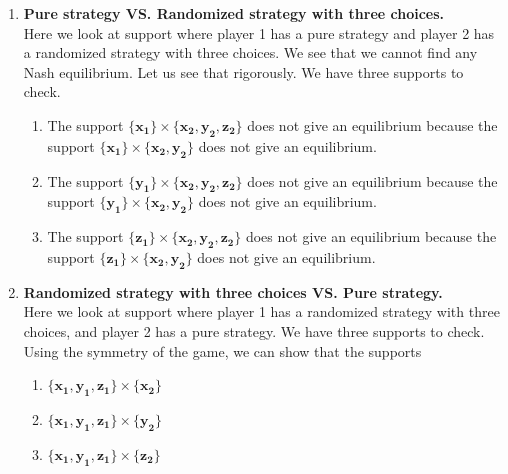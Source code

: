 \begin{enumerate} [label=\Alph*. ]
\begin{enumerate} [label*= (\arabic*)]
    \item $\mathbf{\{x_1, y_1\}} \times \mathbf{\{y_2\}}$
    \item $\mathbf{\{x_1, z_1\}} \times \mathbf{\{y_2\}}$
    \item $\mathbf{\{y_1, z_1\}} \times \mathbf{\{y_2\}}$
    
    \item $\mathbf{\{x_1, y_1\}} \times \mathbf{\{z_2\}}$
    \item $\mathbf{\{x_1, z_1\}} \times \mathbf{\{z_2\}}$
    \item $\mathbf{\{y_1, z_1\}} \times \mathbf{\{z_2\}}$
\end{enumerate}

do not give an equilibrium.


\item \textbf{Pure strategy VS. Randomized strategy with three choices.} \\
Here we look at support where player 1 has a pure strategy and player 2 has a randomized strategy with three choices. We see that we cannot find any Nash equilibrium. Let us see that rigorously. We have three supports to check.

\begin{enumerate} [label*= (\arabic*)]
    \item The support $\mathbf{\{x_1\}} \times \mathbf{\{x_2, y_2, z_2\}}$ does not give an equilibrium because the support $\mathbf{\{x_1\}} \times \mathbf{\{x_2, y_2\}}$ does not give an equilibrium.
    
    \item The support $\mathbf{\{y_1\}} \times \mathbf{\{x_2, y_2, z_2\}}$ does not give an equilibrium because the support $\mathbf{\{y_1\}} \times \mathbf{\{x_2, y_2\}}$ does not give an equilibrium.
    
    \item The support $\mathbf{\{z_1\}} \times \mathbf{\{x_2, y_2, z_2\}}$ does not give an equilibrium because the support $\mathbf{\{z_1\}} \times \mathbf{\{x_2, y_2\}}$ does not give an equilibrium.
\end{enumerate}

\item \textbf{Randomized strategy with three choices VS. Pure strategy.} \\
Here we look at support where player 1 has a randomized strategy with three choices, and player 2 has a pure strategy. We have three supports to check. Using the symmetry of the game, we can show that the supports
\begin{enumerate} [label*= (\arabic*)]
    \item $\mathbf{\{x_1, y_1, z_1\}} \times \mathbf{\{x_2\}}$
    \item $\mathbf{\{x_1, y_1, z_1\}} \times \mathbf{\{y_2\}}$
    \item $\mathbf{\{x_1, y_1, z_1\}} \times \mathbf{\{z_2\}}$
\end{enumerate}


\end{enumerate}
